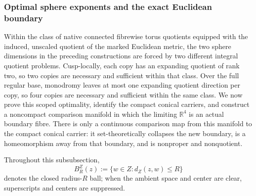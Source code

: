 
\subsubsection{Optimal sphere exponents and the exact Euclidean boundary}
\label{cusp-cone-optimal-strengthening}

Within the class of native connected fibrewise torus quotients equipped with
the induced, unscaled quotient of the marked Euclidean metric, the two sphere
dimensions in the preceding constructions are forced by two different
integral quotient problems.  Cusp-locally, each copy has an expanding
quotient of rank two, so two copies are necessary and sufficient within that
class.  Over the full regular base, monodromy leaves at most one expanding
quotient direction per copy, so four copies are necessary and sufficient
within the same class.  We now prove this scoped optimality, identify the
compact conical carriers, and construct a noncompact comparison manifold in
which the limiting \(\mathbb R^4\) is an actual boundary fibre.  There is only
a continuous comparison map from this manifold to the compact conical
carrier: it set-theoretically collapses the new boundary, is a homeomorphism
away from that boundary, and is nonproper and nonquotient.

Throughout this subsubsection,
\[
 B_R^Z(z):=\{w\in Z:d_Z(z,w)\leq R\}
\]
denotes the closed radius-\(R\) ball; when the ambient space and center are
clear, superscripts and centers are suppressed.

